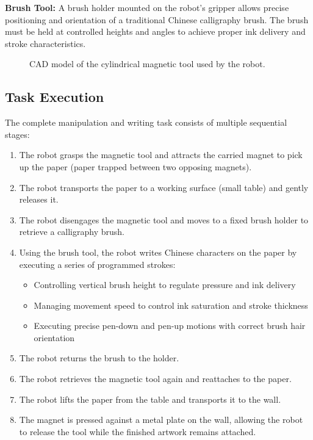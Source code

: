 \documentclass[11pt]{article}
\begin{document}
\textbf{Brush Tool:} A brush holder mounted on the robot's gripper allows precise positioning and orientation of a traditional Chinese calligraphy brush. The brush must be held at controlled heights and angles to achieve proper ink delivery and stroke characteristics.

\begin{figure}[H]
\centering
\fbox{\rule{0pt}{5cm}\rule{10cm}{0pt}}
\caption{CAD model of the cylindrical magnetic tool used by the robot.}
\end{figure}

\subsection{Task Execution}

The complete manipulation and writing task consists of multiple sequential stages:

\begin{enumerate}
\item The robot grasps the magnetic tool and attracts the carried magnet to pick up the paper (paper trapped between two opposing magnets).
\item The robot transports the paper to a working surface (small table) and gently releases it.
\item The robot disengages the magnetic tool and moves to a fixed brush holder to retrieve a calligraphy brush.
\item Using the brush tool, the robot writes Chinese characters on the paper by executing a series of programmed strokes:
    \begin{itemize}
    \item Controlling vertical brush height to regulate pressure and ink delivery
    \item Managing movement speed to control ink saturation and stroke thickness
    \item Executing precise pen-down and pen-up motions with correct brush hair orientation
    \end{itemize}
\item The robot returns the brush to the holder.
\item The robot retrieves the magnetic tool again and reattaches to the paper.
\item The robot lifts the paper from the table and transports it to the wall.
\item The magnet is pressed against a metal plate on the wall, allowing the robot to release the tool while the finished artwork remains attached.
\end{enumerate}
\end{document}
